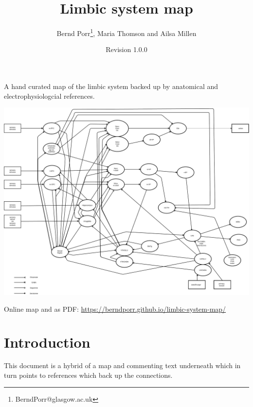 \documentclass[12pt,a4paper]{article}
\title{Limbic system map}
\author{Bernd Porr\footnote{BerndPorr@glasgow.ac.uk}, Maria Thomson and Ailsa Millen}
\date{Revision 1.0.0}
\begin{document}
\maketitle

\begin{center}
  A hand curated map of the limbic system backed up by anatomical and
  electrophysiologcial references.
\end{center}

\begin{latexonly}
  \begin{center}
    \includegraphics[width=\textwidth]{limbic-map}
  \end{center}
  {\footnotesize Online map and as PDF: \url{https://berndporr.github.io/limbic-system-map/}}
\end{latexonly}


\clearpage

\tableofcontents

\section{Introduction}
This document is a hybrid of a map and commenting text
underneath which in turn points to references which back up the
connections.
\end{document}
